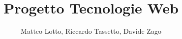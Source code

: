 \documentclass[a4paper,12pt]{article}
\begin{document}
\title{Progetto Tecnologie Web}
\author{Matteo Lotto, Riccardo Tassetto, Davide Zago}
\date{}
\maketitle
\tableofcontents








\end{document}
